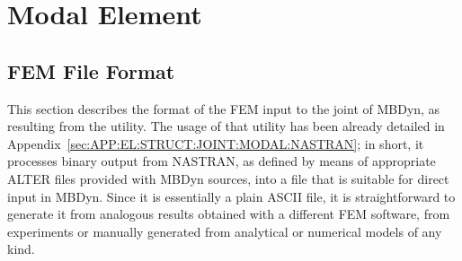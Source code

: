 %
%
%
%
%
% 
%
%

\chapter{Modal Element}

\section{FEM File Format}
\label{sec:APP:EL:STRUCT:JOINT:MODAL:FORMAT}

This section describes the format of the FEM input to the 
joint of MBDyn, as resulting from the  utility.
The usage of that utility has been already detailed 
in Appendix~\ref{sec:APP:EL:STRUCT:JOINT:MODAL:NASTRAN};
in short, it processes binary output from NASTRAN, as defined by means
of appropriate ALTER files provided with MBDyn sources, into a file
 that is suitable for direct input in MBDyn.
Since it is essentially a plain ASCII file, it is straightforward
to generate it from analogous results obtained with a different 
FEM software, from experiments or manually generated from analytical
or numerical models of any kind.

